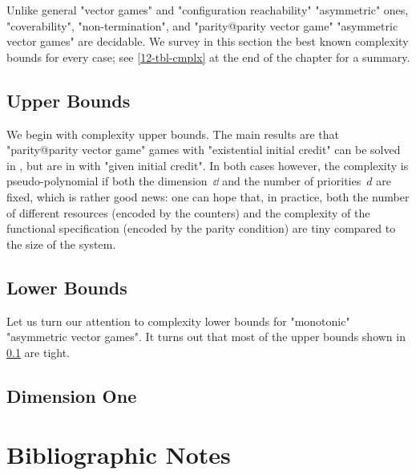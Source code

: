 Unlike general "vector games" and "configuration reachability"
"asymmetric" ones, "coverability", "non-termination", and
"parity@parity vector game" "asymmetric vector games" are decidable.
We survey in this section the best known complexity bounds for every
case; see \cref{12-tbl-cmplx} at the end of the chapter for a summary.

\subsection{Upper Bounds}
\label{12-sub-up}
We begin with complexity upper bounds.  The main results are that
"parity@parity vector game" games with "existential initial credit"
can be solved in \coNP, but are in \kEXP[2] with "given initial
credit".  In both cases however, the complexity is pseudo-polynomial
if both the dimension~$\dd$ and the number of priorities~$d$ are
fixed, which is rather good news: one can hope that, in practice, both
the number of different resources (encoded by the counters) and the
complexity of the functional specification (encoded by the parity
condition) are tiny compared to the size of the system.



\subsection{Lower Bounds}
\label{12-sub-low}
Let us turn our attention to complexity lower bounds for "monotonic"
"asymmetric vector games".  It turns out that most of the upper bounds
shown in \cref{12-sub-up} are tight.

  
\subsection{Dimension One}
\label{12-sub-mono-dim1}


\section*{Bibliographic Notes}
\label{12-refs}
\ifstandalone{}\fi%


